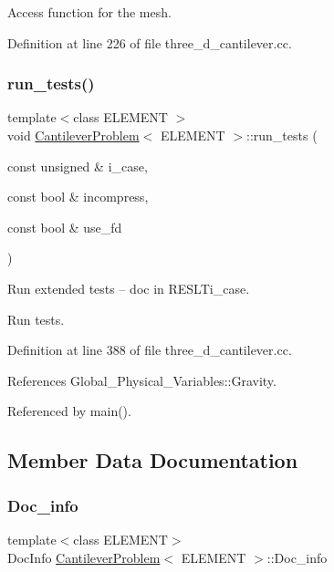 Access function for the mesh. 



Definition at line 226 of file three\+\_\+d\+\_\+cantilever.\+cc.

\mbox{\label{classCantileverProblem_aff6fdf1e52813bf62e2b4514dbda7f00}} 
\subsubsection{\texorpdfstring{run\+\_\+tests()}{run\_tests()}}
{\footnotesize\ttfamily template$<$class E\+L\+E\+M\+E\+NT $>$ \\
void \hyperlink{classCantileverProblem}{Cantilever\+Problem}$<$ E\+L\+E\+M\+E\+NT $>$\+::run\+\_\+tests (\begin{DoxyParamCaption}\item[{const unsigned \&}]{i\+\_\+case,  }\item[{const bool \&}]{incompress,  }\item[{const bool \&}]{use\+\_\+fd }\end{DoxyParamCaption})}



Run extended tests -- doc in R\+E\+S\+L\+Ti\+\_\+case. 

Run tests. 

Definition at line 388 of file three\+\_\+d\+\_\+cantilever.\+cc.



References Global\+\_\+\+Physical\+\_\+\+Variables\+::\+Gravity.



Referenced by main().



\subsection{Member Data Documentation}
\mbox{\label{classCantileverProblem_a2d230bb59f229cf02a06a50493dd48e4}} 
\subsubsection{\texorpdfstring{Doc\+\_\+info}{Doc\_info}}
{\footnotesize\ttfamily template$<$class E\+L\+E\+M\+E\+NT$>$ \\
Doc\+Info \hyperlink{classCantileverProblem}{Cantilever\+Problem}$<$ E\+L\+E\+M\+E\+NT $>$\+::Doc\+\_\+info\hspace{0.3cm}{\ttfamily [private]}}



